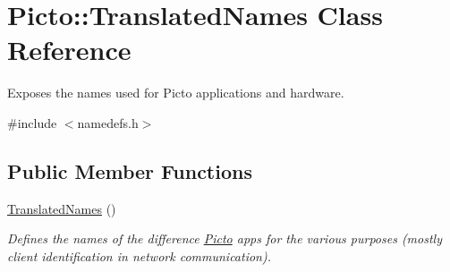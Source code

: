 \hypertarget{class_picto_1_1_translated_names}{\section{Picto\-:\-:Translated\-Names Class Reference}
\label{class_picto_1_1_translated_names}
}


Exposes the names used for Picto applications and hardware.  




{\ttfamily \#include $<$namedefs.\-h$>$}

\subsection*{Public Member Functions}
\begin{DoxyCompactItemize}
\item 
\hypertarget{class_picto_1_1_translated_names_ad3cc75cca16250eb7d6723cfb1027bc5}{\hyperlink{class_picto_1_1_translated_names_ad3cc75cca16250eb7d6723cfb1027bc5}{Translated\-Names} ()}\label{class_picto_1_1_translated_names_ad3cc75cca16250eb7d6723cfb1027bc5}

\begin{DoxyCompactList}\small\item\em Defines the names of the difference \hyperlink{namespace_picto}{Picto} apps for the various purposes (mostly client identification in network communication). \end{DoxyCompactList}\end{DoxyCompactItemize}
